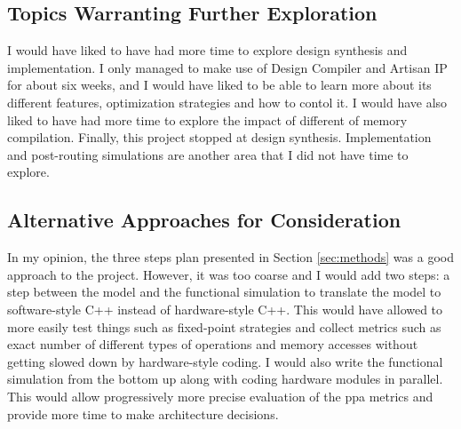 \subsection{Topics Warranting Further Exploration}
I would have liked to have had more time to explore design synthesis and implementation. I only managed to make use of Design Compiler and Artisan IP for about six weeks, and I would have
liked to be able to learn more about its different features, optimization strategies and how to contol it. I would have also liked to have had more time to explore the impact of different
of memory compilation. Finally, this project stopped at design synthesis. Implementation and post-routing simulations are another area that I did not have time to explore.

\subsection{Alternative Approaches for Consideration}
In my opinion, the three steps plan presented in Section \ref{sec:methods} was a good approach to the project. However, it was too coarse and I would add two steps: a step between the model
and the functional simulation to translate the model to software-style C++ instead of hardware-style C++. This would have allowed to more easily test things such as fixed-point strategies
and collect metrics such as exact number of different types of operations and memory accesses without getting slowed down by hardware-style coding. I would also write the functional simulation
from the bottom up along with coding hardware modules in parallel. This would allow progressively more precise evaluation of the \ac{ppa} metrics and provide more time to make architecture 
decisions.